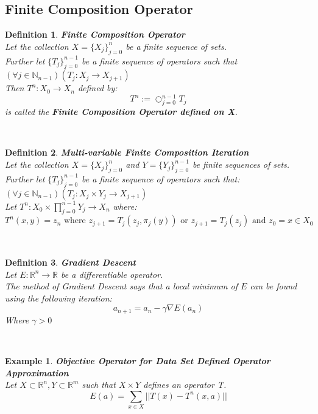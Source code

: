 \documentclass[12pt]{extarticle}
\theoremstyle{plain}
\theoremstyle{plain}
\theoremstyle{plain}
\theoremstyle{Definition}
\newtheorem{def.}{Definition}[section]
\theoremstyle{Definition}
\theoremstyle{plain}
\newtheorem{exmp}{Example}[section]
\newcommand{\cut}[0]{\noindent\framebox[\linewidth]{\rule{\linewidth}{2pt}}\\}
\begin{document}
\subsection{Finite Composition Operator}
\begin{def.} \textbf{Finite Composition Operator} \\ 
	Let the collection $X = \{X_j\}_{j=0}^{n}$ be a finite sequence of sets. \\ 
	Further let $\{T_j\}_{j=0}^{n-1}$ be a finite sequence of operators such that $(\forall j \in \mathbb{N}_{n-1})(T_j : X_j \to X_{j+1})$ \\ 
	Then $T^n : X_0 \to X_{n}$ defined by: 
	$$T^n := \bigcirc_{j=0}^{n-1} T_j$$ 
	is called the \textbf{Finite Composition Operator defined on X}. \\ 
\end{def.}
\cut
\begin{def.} \textbf{Multi-variable Finite Composition Iteration} \\ 
	Let the collection $X = \{X_j\}_{j=0}^n$ and $Y = \{Y_j\}_{j=0}^{n-1}$ be finite sequences of sets. \\ 
	Further let $\{T_j\}_{j=0}^{n-1}$ be a finite sequence of operators such that: $(\forall j \in \mathbb{N}_{n-1})(T_j : X_j \times Y_j \to X_{j+1})$ \\
	Let $T^n : X_0 \times \prod_{j=0}^{n-1}Y_j \to X_n$ where: \\ 
	$$T^n (x,y) = z_n \text{ where } z_{j+1} = T_j( z_{j},\pi_j (y) ) \text{ or } z_{j+1} = T_j( z_{j} )  \text{ and } z_0 = x \in X_0$$
\end{def.}
\cut
\begin{def.} \textbf{Gradient Descent} \\ 
Let $E : \mathbb{R}^n \to \mathbb{R}$ be a differentiable operator. \\ 
The method of Gradient Descent says that a local minimum of $E$ can be found using the following iteration: \\ 
$$a_{n+1} = a_n - \gamma \nabla E(a_n)$$
Where $\gamma > 0$ \\ 
\end{def.}
\cut
\begin{exmp} \textbf{Objective Operator for Data Set Defined Operator Approximation} \\ 		
Let $X \subset \mathbb{R}^n, Y \subset \mathbb{R}^m$ such that $X\times Y$ defines an operator T. \\ 
$$E(a) = \sum_{x \in X} ||T(x) - T^n(x,a)||$$ 
\end{exmp}
\cut
\newpage
\end{document}
